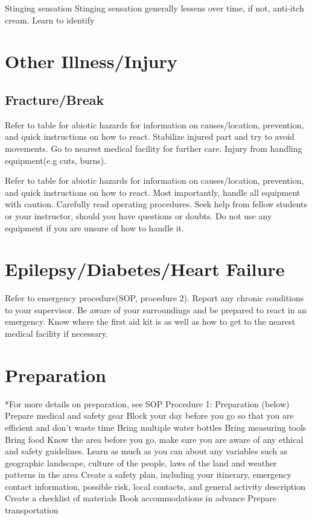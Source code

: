 \documentclass[12pt]{../SOP3_beta}
\begin{document}
Stinging sensation
Stinging sensation generally lessens over time, if not, anti-itch cream.
Learn to identify


\section{Other Illness/Injury}

\subsection{Fracture/Break}

\NP Refer to table for abiotic hazards for information on causes/location, prevention, and quick instructions on how to react. Stabilize injured part and try to avoid movements. Go to nearest medical facility for further care.
Injury from handling equipment(e.g cuts, burns).


\NP Refer to table for abiotic hazards for information on causes/location, prevention, and quick instructions on how to react. Most importantly, handle all equipment with caution. Carefully read operating procedures. Seek help from fellow students or your instructor, should you have questions or doubts. Do not use any equipment if you are unsure of how to handle it. 

\section{Epilepsy/Diabetes/Heart Failure}

Refer to emergency procedure(SOP, procedure 2).
Report any chronic conditions to your supervisor.
Be aware of your surroundings and be prepared to react in an emergency.
Know where the first aid kit is as well as how to get to the nearest medical facility if necessary. 


\section{Preparation}

*For more details on preparation, see SOP Procedure 1: Preparation (below)
Prepare medical and safety gear 
Block your day before you go so that you are efficient and don't waste time
Bring multiple water bottles
Bring measuring tools
Bring food
Know the area before you go, make sure you are aware of any ethical and safety guidelines. Learn as much as you can about any variables such as geographic landscape, culture of the people, laws of the land and weather patterns in the area
Create a safety plan, including your itinerary, emergency contact information, possible risk, local contacts, and general activity description 
Create a checklist of materials 
Book accommodations in advance
Prepare transportation
\end{document}
